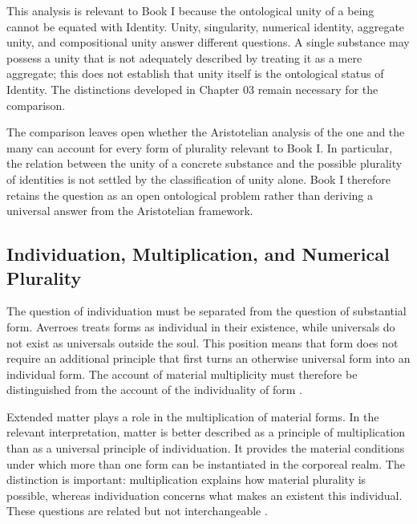 This analysis is relevant to Book I because the
ontological unity of a being cannot be equated with
Identity. Unity, singularity, numerical identity,
aggregate unity, and compositional unity answer
different questions. A single substance may possess
a unity that is not adequately described by treating
it as a mere aggregate; this does not establish that
unity itself is the ontological status of Identity.
The distinctions developed in Chapter 03 remain
necessary for the comparison.

\label{para:VS.B01.P01.C08.S15.SS09.P004}

The comparison leaves open whether the Aristotelian
analysis of the one and the many can account for every
form of plurality relevant to Book I. In particular,
the relation between the unity of a concrete substance
and the possible plurality of identities is not settled
by the classification of unity alone. Book I therefore
retains the question as an open ontological problem
rather than deriving a universal answer from the
Aristotelian framework.



\subsection{Individuation, Multiplication, and Numerical Plurality}
\label{subsec:ch08_s15_ss10}

\label{para:VS.B01.P01.C08.S15.SS10.P001}

The question of individuation must be separated from
the question of substantial form. Averroes treats forms
as individual in their existence, while universals
do not exist as universals outside the soul. This
position means that form does not require an additional
principle that first turns an otherwise universal
form into an individual form. The account of material
multiplicity must therefore be distinguished from
the account of the individuality of form
\citep{AverroesEpitomeMetaphysicsArnzen2010,
BenAhmedPasnauIbnRushdSEP2025}.

\label{para:VS.B01.P01.C08.S15.SS10.P002}

Extended matter plays a role in the multiplication
of material forms. In the relevant interpretation,
matter is better described as a principle of multiplication
than as a universal principle of individuation. It
provides the material conditions under which more
than one form can be instantiated in the corporeal
realm. The distinction is important: multiplication
explains how material plurality is possible, whereas
individuation concerns what makes an existent this
individual. These questions are related but not
interchangeable
\citep{DiGiovanniIndividuationMatterAverroes2007,
BenAhmedPasnauIbnRushdSEP2025}.

